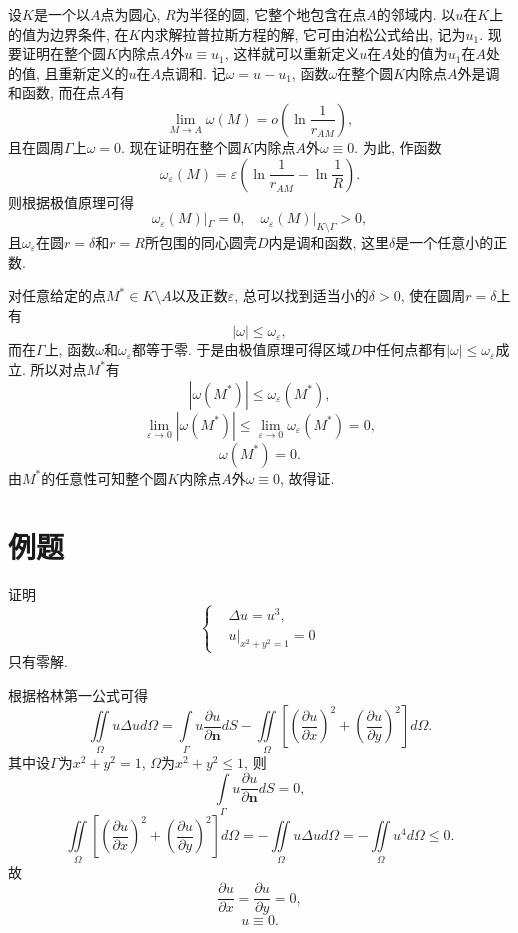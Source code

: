 \documentclass[11pt,a4paper]{article}
\begin{document}
设$K$是一个以$A$点为圆心, $R$为半径的圆, 它整个地包含在点$A$的邻域内. 以$u$在$K$上的值为边界条件, 在$K$内求解拉普拉斯方程的解, 它可由泊松公式给出, 记为$u_1$. 现要证明在整个圆$K$内除点$A$外$u\equiv u_1$, 这样就可以重新定义$u$在$A$处的值为$u_1$在$A$处的值, 且重新定义的$u$在$A$点调和. 记$\omega=u-u_1$, 函数$\omega$在整个圆$K$内除点$A$外是调和函数, 而在点$A$有
$$\lim_{M\to A}\omega(M)=o\left(\ln\frac{1}{r_{AM}}\right),$$
且在圆周$\Gamma$上$\omega=0$. 现在证明在整个圆$K$内除点$A$外$\omega\equiv0$. 为此, 作函数
$$\omega_\varepsilon(M)=\varepsilon\left(\ln\frac{1}{r_{AM}}-\ln\frac{1}{R}\right).$$
则根据极值原理可得
$$\omega_\varepsilon(M)|_{\Gamma}=0,\quad \omega_\varepsilon(M)|_{K\setminus\Gamma}>0,$$
且$\omega_\varepsilon$在圆$r=\delta$和$r=R$所包围的同心圆壳$D$内是调和函数, 这里$\delta$是一个任意小的正数.

对任意给定的点$M^*\in K\setminus A$以及正数$\varepsilon$, 总可以找到适当小的$\delta>0$, 使在圆周$r=\delta$上有
$$|\omega|\leqslant\omega_\varepsilon,$$
而在$\Gamma$上, 函数$\omega$和$\omega_\varepsilon$都等于零. 于是由极值原理可得区域$D$中任何点都有$|\omega|\leqslant\omega_\varepsilon$成立. 所以对点$M^*$有
$$|\omega(M^*)|\leqslant\omega_\varepsilon(M^*),$$
$$\lim_{\varepsilon \to0}|\omega(M^*)|\leqslant\lim_{\varepsilon \to0}\omega_\varepsilon(M^*)=0,$$
$$\omega(M^*)=0.$$
由$M^*$的任意性可知整个圆$K$内除点$A$外$\omega\equiv0$, 故得证.

\section*{例题}
\begin{problem}
证明
$$\left\{\begin{aligned}
     & \Delta u=u^3,    \\
     & u|_{x^2+y^2=1}=0
  \end{aligned}\right.$$
只有零解.
\end{problem}

根据格林第一公式可得
$$\iint\limits_\Omega u\Delta ud\Omega=\int\limits_\Gamma u\frac{\partial u}{\partial\mathbf{n}}dS-\iint\limits_\Omega\left[\left(\frac{\partial u}{\partial x}\right)^2+\left(\frac{\partial u}{\partial y}\right)^2\right]d\Omega.$$
其中设$\Gamma$为$x^2+y^2=1$, $\Omega$为$x^2+y^2\leqslant 1$, 则
$$\int\limits_\Gamma u\frac{\partial u}{\partial\mathbf{n}}dS=0,$$
$$\iint\limits_\Omega\left[\left(\frac{\partial u}{\partial x}\right)^2+\left(\frac{\partial u}{\partial y}\right)^2\right]d\Omega=-\iint\limits_\Omega u\Delta ud\Omega=-\iint\limits_\Omega u^4 d\Omega\leqslant0.$$
故
$$\frac{\partial u}{\partial x}=\frac{\partial u}{\partial y}=0,$$
$$u\equiv 0.$$
\end{document}
